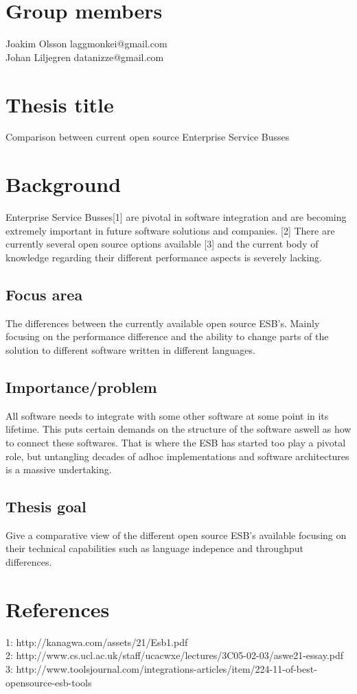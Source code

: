 \documentclass[11pt]{article} %
\begin{document}
\section{Group members}
Joakim Olsson laggmonkei@gmail.com \\
Johan Liljegren datanizze@gmail.com

\section{Thesis title}
Comparison between current open source Enterprise Service Busses

\section{Background}
Enterprise Service Busses[1] are pivotal in software integration and are becoming extremely important in future software solutions and companies. [2]
There are currently several open source options available [3] and the current body of knowledge regarding their different performance aspects is severely lacking.


\subsection{Focus area}
The differences between the currently available open source ESB’s.
Mainly focusing on the performance difference and the ability to change parts of the solution to different software written in different languages.

\subsection{Importance/problem}
All software needs to integrate with some other software at some point in its lifetime.
This puts certain demands on the structure of the software aswell as how to connect these
softwares. That is where the ESB has started too play a pivotal role, but untangling
decades of adhoc implementations and software architectures is a massive undertaking.

\subsection{Thesis goal}
Give a comparative view of the different open source ESB’s available focusing on their
technical capabilities such as language indepence and throughput differences.

\section{References}
1: http://kanagwa.com/assets/21/Esb1.pdf \\
2:  http://www.cs.ucl.ac.uk/staff/ucacwxe/lectures/3C05-02-03/aswe21-essay.pdf \\
3: http://www.toolsjournal.com/integrations-articles/item/224-11-of-best-opensource-esb-tools \\
\end{document}

